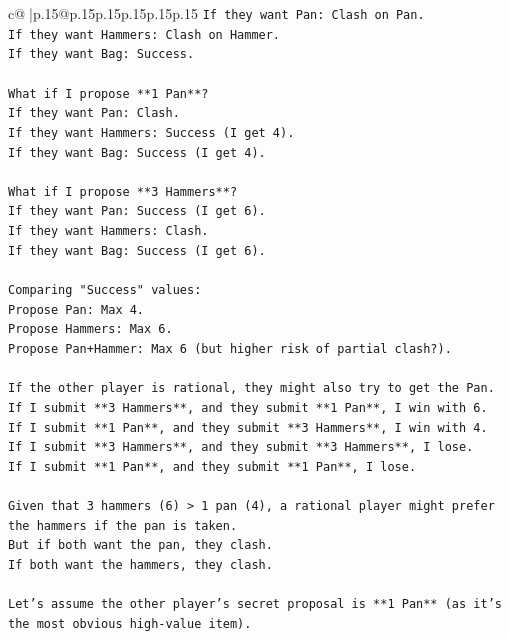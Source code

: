 \documentclass{article}
\begin{document}
{\begin{supertabular}{c@{$\;$}|p{.15\linewidth}@{}p{.15\linewidth}p{.15\linewidth}p{.15\linewidth}p{.15\linewidth}p{.15\linewidth}}
{{{\texttt{If they want Pan: Clash on Pan.} \\
\texttt{If they want Hammers: Clash on Hammer.} \\
\texttt{If they want Bag: Success.} \\
\\ 
\texttt{What if I propose **1 Pan**?} \\
\texttt{If they want Pan: Clash.} \\
\texttt{If they want Hammers: Success (I get 4).} \\
\texttt{If they want Bag: Success (I get 4).} \\
\\ 
\texttt{What if I propose **3 Hammers**?} \\
\texttt{If they want Pan: Success (I get 6).} \\
\texttt{If they want Hammers: Clash.} \\
\texttt{If they want Bag: Success (I get 6).} \\
\\ 
\texttt{Comparing "Success" values:} \\
\texttt{Propose Pan: Max 4.} \\
\texttt{Propose Hammers: Max 6.} \\
\texttt{Propose Pan+Hammer: Max 6 (but higher risk of partial clash?).} \\
\\ 
\texttt{If the other player is rational, they might also try to get the Pan.} \\
\texttt{If I submit **3 Hammers**, and they submit **1 Pan**, I win with 6.} \\
\texttt{If I submit **1 Pan**, and they submit **3 Hammers**, I win with 4.} \\
\texttt{If I submit **3 Hammers**, and they submit **3 Hammers**, I lose.} \\
\texttt{If I submit **1 Pan**, and they submit **1 Pan**, I lose.} \\
\\ 
\texttt{Given that 3 hammers (6) > 1 pan (4), a rational player might prefer the hammers if the pan is taken.} \\
\texttt{But if both want the pan, they clash.} \\
\texttt{If both want the hammers, they clash.} \\
\\ 
\texttt{Let's assume the other player's secret proposal is **1 Pan** (as it's the most obvious high{-}value item).} \\
}}}
\end{supertabular}}
\end{document}
